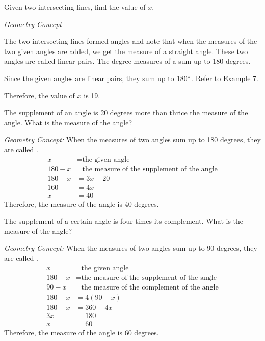 \begin{example}
\Item Given two intersecting lines, find the value of $x$.


\Solution

\textit{Geometry Concept}

The two intersecting lines formed angles and note that when the measures of the two given angles are
added, we get the measure of a straight angle. These two angles are called linear pairs. The degree
measures of a  sum up to 180 degrees.

Since the given angles are linear pairs, they sum up to $180\mathrm{^{\circ}}$. Refer to Example 7. %

Therefore, the value of $x$ is 19.
\end{example}

\begin{example}
\Item The supplement of an angle is 20 degrees more than thrice the measure of the angle. What is the
measure of the angle?

\Solution

\textit{Geometry Concept:} When the measures of two angles sum up to 180 degrees, they are called .
\begin{align*}
x &= \text{the given angle}\\
180 - x &= \text{the measure of the supplement of the angle}\\
180 - x &= 3x + 20\\
160 &= 4x\\
x &= 40
\end{align*}
Therefore, the measure of the angle is 40 degrees.
\end{example}

\begin{example}
\Item The supplement of a certain angle is four times its complement. What is the measure of the angle?

\Solution

\textit{Geometry Concept:} When the measures of two angles sum up to 90 degrees, they are called .
\begin{align*}
x &= \text{the given angle}\\
180 - x &= \text{the measure of the supplement of the angle}\\
90 - x &= \text{the measure of the complement of the angle}\\
180 - x &= 4(90 - x)\\
180 - x &= 360 - 4x\\
3x &= 180\\
x &= 60
\end{align*}
Therefore, the measure of the angle is 60 degrees.
\end{example}
